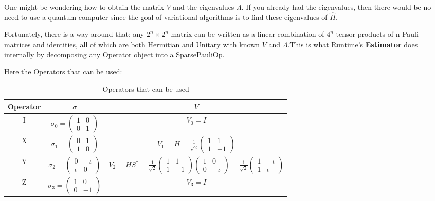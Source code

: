 \documentclass[12pt, oneside]{book}
\theoremstyle{definition}
\theoremstyle{definition}
\theoremstyle{remark}
\begin{document}
One might be wondering how to obtain the matrix $V$ and the eigenvalues $\Lambda$. If you already had the eigenvalues, then there would be no need to use a quantum computer since the goal of variational algorithms is to find these eigenvalues of $\hat{H}$.

Fortunately, there is a way around that: any $2^n \times 2^n$ matrix can be written as a linear combination of $4^n$ tensor products of n Pauli matrices and identities, all of which are both Hermitian and Unitary with known $V$ and $\Lambda$.This is what Runtime's \textbf{Estimator} does internally by decomposing any Operator object into a SparsePauliOp.

Here the Operators that can be used:

\begin{table}[H]
    \centering
    \begin{tabular}{|c|c|c|}
    \hline
        Operator & $\sigma$ & $V$\\
        \hline
        I & $\sigma_0=\begin{pmatrix} 1 & 0 \\ 0 & 1 \end{pmatrix}$ & $V_0=I$\\
        \hline
        X & $\sigma_1=\begin{pmatrix} 0 & 1 \\ 1 & 0 \end{pmatrix}$ & $V_1=H=\frac{1}{\sqrt{2}}\begin{pmatrix} 1 & 1 \\ 1 & -1 \end{pmatrix}$\\
        \hline
        Y & $\sigma_2=\begin{pmatrix} 0 & -\iota \\ \iota & 0 \end{pmatrix}$ &$V_2=HS^{\dagger}=\frac{1}{\sqrt{2}}\begin{pmatrix} 1 & 1 \\ 1 & -1 \end{pmatrix}\begin{pmatrix} 1 & 0 \\ 0 & -\iota \end{pmatrix}=\frac{1}{\sqrt{2}}\begin{pmatrix} 1 & -\iota \\ 1 & \iota \end{pmatrix}$\\
        \hline
        Z & $\sigma_3=\begin{pmatrix} 1 & 0 \\ 0 &-1 \end{pmatrix} $& $V_3=I$\\
        \hline
    \end{tabular}
    \caption{Operators that can be used}
    \label{tab:operators_used}
\end{table}
\end{document}
